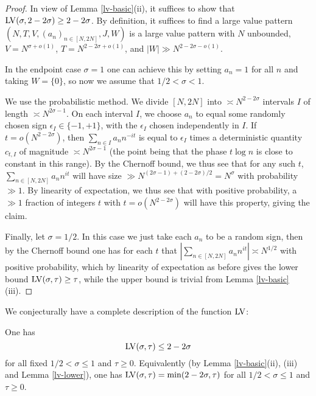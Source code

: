 \begin{proof} In view of Lemma \ref{lv-basic}(ii), it suffices to show that $\mathrm{LV}(\sigma, 2-2\sigma) \geq 2-2\sigma$.  By definition, it suffices to find a large value pattern $(N,T,V,(a_n)_{n \in [N,2N]},J,W)$ is a large value pattern with $N$ unbounded, $V=N^{\sigma+o(1)}$, $T = N^{2-2\sigma+o(1)}$, and $|W| \gg N^{2-2\sigma-o(1)}$.

In the endpoint case $\sigma = 1$ one can achieve this by setting $a_n=1$ for all $n$ and taking $W=\{0\}$, so now we assume that $1/2 < \sigma<1$.

We use the probabilistic method.  We divide $[N,2N]$ into $\asymp N^{2-2\sigma}$ intervals $I$ of length $\asymp N^{2\sigma-1}$.  On each interval $I$, we choose $a_n$ to equal some randomly chosen sign $\epsilon_I \in \{-1,+1\}$, with the $\epsilon_I$ chosen independently in $I$.  If $t = o(N^{2-2\sigma})$, then $\sum_{n \in I} a_n n^{-it}$ is equal to $\epsilon_I$ times a deterministic quantity $c_{t,I}$ of magnitude $\asymp N^{2\sigma-1}$ (the point being that the phase $t \log n$ is close to constant in this range).  By the Chernoff bound, we thus see that for any such $t$, $\sum_{n \in [N,2N]} a_n n^{it}$ will have size $\gg N^{(2\sigma-1) + (2-2\sigma)/2} = N^\sigma$ with probability $\gg 1$. By linearity of expectation, we thus see that with positive probability, a $\gg 1$ fraction of integers $t$ with $t = o(N^{2-2\sigma})$ will have this property, giving the claim.

Finally, let $\sigma=1/2$.  In this case we just take each $a_n$ to be a random sign, then by the Chernoff bound one has for each $t$ that $|\sum_{n \in [N,2N]} a_n n^{it}| \asymp N^{1/2}$ with positive probability, which by linearity of expectation as before gives the lower bound $\mathrm{LV}(\sigma,\tau) \geq \tau$, while the upper bound is trivial from Lemma \ref{lv-basic}(iii).
\end{proof}

We conjecturally have a complete description of the function $\mathrm{LV}$:

\begin{conjecture}\label{montgomery-conj}  One has
    \begin{equation}\label{mont-conj}
        \mathrm{LV}(\sigma, \tau) \leq 2 - 2 \sigma
    \end{equation}
     for all fixed $1/2 < \sigma \leq 1$ and $\tau \geq 0$. Equivalently (by Lemma \ref{lv-basic}(ii), (iii) and Lemma \ref{lv-lower}), one has $\mathrm{LV}(\sigma, \tau) = \min(2 - 2 \sigma,\tau)$ for all $1/2 < \sigma \leq 1$ and $\tau \geq 0$.
\end{conjecture}

